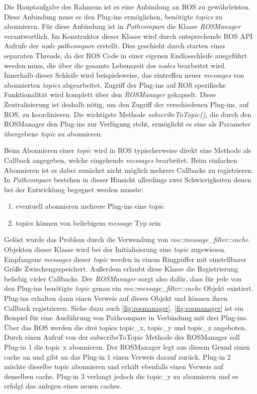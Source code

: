 Die Hauptaufgabe des Rahmens ist es eine Anbindung an ROS zu gewährleisten.
Diese Anbindung muss es den Plug-ins ermöglichen, benötigte \textit{topics} zu
abonnieren. Für diese Anbindung ist in \textit{Pathcompare} die Klasse
\textit{ROSManager} verantwortlich. Im Konstruktor dieser Klasse wird durch
entsprechende ROS API Aufrufe der \textit{node} \textit{pathcompare}
erstellt. Dies geschieht durch starten eines separaten Threads, da der ROS Code
in einer eigenen Endlosschleife ausgeführt werden muss, die über die gesamte
Lebenszeit des \textit{nodes} bearbeitet wird. Innerhalb dieser Schleife wird
beispielsweise, das eintreffen neuer \textit{messages} von abonnierten
\textit{topics} abgearbeitet.
Zugriff der Plug-ins auf ROS spezifische Funktionalität wird komplett über den
\textit{ROSManager} gekapselt. Diese Zentralisierung ist deshalb nötig, um den Zugriff
der verschiedenen Plug-ins, auf ROS, zu koordinieren. 
Die wichtigste Methode \textit{subscribeToTopic()}, die durch den ROSManager den Plug-ins zur
Verfügung steht, ermöglicht es eine als Parameter übergebene \textit{topic} zu
abonnieren. 


Beim Abonnieren einer \textit{topic} wird in ROS typischerweise direkt eine
Methode als Callback angegeben, welche eingehende \textit{messages} bearbeitet.
Beim einfachen Abonnieren ist es dabei zunächst nicht möglich mehrere
Callbacks zu registrieren.
In \textit{Pathcompare} bestehen in dieser Hinsicht allerdings zwei
Schwierigkeiten denen bei der Entwicklung begegnet werden musste:

\begin{enumerate}
  \item eventuell abonnieren mehrere Plug-ins eine topic
  \item topics können von beliebigem \textit{message} Typ sein
\end{enumerate}

Gelöst wurde das Problem durch die Verwendung von
\textit{ros::message\_filter::cache}. Objekten dieser Klasse wird bei der
Initialisierung eine \textit{topic} zugewiesen. Empfangene \textit{messages}
dieser \textit{topic} werden in einem Ringpuffer mit einstellbarer Größe
Zwischengespeichert.  Außerdem erlaubt diese Klasse die Registrierung beliebig
vieler Callbacks.  Der \textit{ROSManager} sorgt also dafür, dass für jede von
den Plug-ins benötigte \textit{topic} genau ein
\textit{ros::message\_filter::cache} Objekt existiert. Plug-ins erhalten dann
einen Verweis auf dieses Objekt und können ihren Callback registrieren. Siehe
dazu auch \autoref{fig:rosmanager}.
\autoref{fig:rosmanager} ist ein Beispiel für eine Ausführung von Pathcompare
in Verbindung mit drei Plug-ins. Über das ROS werden die drei topics topic\_x,
topic\_y und topic\_z angeboten. Durch einen Aufruf von der subscribeToTopic Methode
des ROSManager soll Plug-in 1 die topic x abonnieren. Der ROSManager legt aus
diesem Grund einen cache an und gibt an das Plug-in 1 einen Verweis darauf
zurück. Plug-in 2 möchte dieselbe topic abonnieren und erhält ebenfalls einen
Verweis auf denselben cache. Plug-in 3 verlangt jedoch die topic\_y zu
abonnieren und es erfolgt das anlegen eines neuen caches. 

